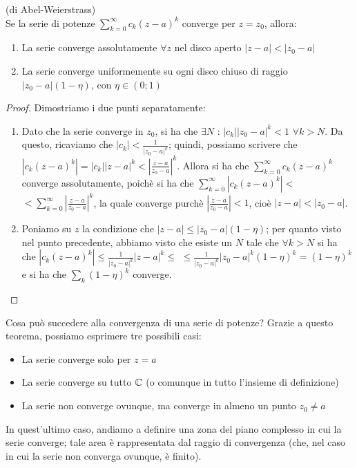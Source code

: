 \begin{teorema} (di Abel-Weierstrass)
\\Se la serie di potenze $\sum_{k=0} ^{\infty} c_k (z-a)^k$ converge per $z=z_0$, allora:

\begin{enumerate}
\item La serie converge assolutamente $\forall z$ nel disco aperto $|z-a|<|z_0-a|$
\item La serie converge uniformemente su ogni disco chiuso di raggio $|z_0-a|(1- \eta)$, con $\eta \in (0;1)$
\end{enumerate}
\end{teorema}
\begin{proof}
Dimostriamo i due punti separatamente:
\begin{enumerate}
\item Dato che la serie converge in $z_0$, si ha che $\exists N$ : $|c_k||z_0-a|^k<1$ $\forall k>N$. Da questo, ricaviamo che $|c_k| < \frac{1}{|z_0-a|^k}$; quindi, possiamo scrivere che $|c_k(z-a)^k|= |c_k||z-a|^k<\left|\frac{z-a}{z_0-a}\right|^k$. Allora si ha che $\sum_{k=0} ^{\infty} c_k (z-a)^k$ converge assolutamente, poichè si ha che $\sum_{k=0} ^{\infty} |c_k (z-a)^k|<$ $<\sum_{k=0} ^{\infty} \left|\frac{z-a}{z_0-a}\right|^k$, la quale converge purchè $\left|\frac{z-a}{z_0-a}\right|<1$, cioè $|z-a|<|z_0-a|$.
\item Poniamo su $z$ la condizione che $|z-a|\leq |z_0-a|(1-\eta)$; per quanto visto nel punto precedente, abbiamo visto che esiste un $N$ tale che $\forall k>N$ si ha che $\left|c_k(z-a)^k\right| \leq \frac{1}{|z_0-a|^k} |z-a|^k \leq$ $\leq  \frac{1}{|z_0-a|^k} |z_0-a|^k (1-\eta)^k=(1-\eta)^k$ e si ha che $\sum_k (1-\eta)^k$ converge.
\end{enumerate}

\end{proof}
Cosa può succedere alla convergenza di una serie di potenze? Grazie a questo teorema, possiamo esprimere tre possibili casi:
\begin{itemize}
\item La serie converge solo per $z=a$
\item La serie converge su tutto $\mathbb{C}$ (o comunque in tutto l'insieme di definizione)
\item La serie non converge ovunque, ma converge in almeno un punto $z_0 \neq a$
\end{itemize}
In quest'ultimo caso, andiamo a definire una zona del piano complesso in cui la serie converge; tale area è rappresentata dal raggio di convergenza (che, nel caso in cui la serie non converga ovunque, è finito).

